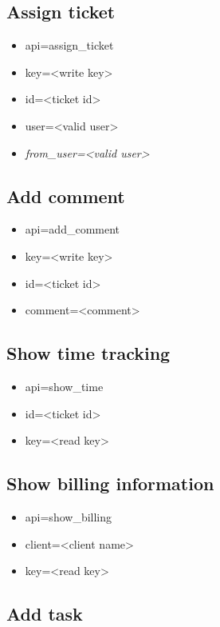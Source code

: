 \documentclass[11pt]{article}
\begin{document}
\subsection{Assign ticket}

\begin{itemize}
\item api=assign\_ticket
\item key=<write key>
\item id=<ticket id>
\item user=<valid user>
\item \textit{from\_user=<valid user>}
\end{itemize}

\subsection{Add comment}

\begin{itemize}
\item api=add\_comment
\item key=<write key>
\item id=<ticket id>
\item comment=<comment>
\end{itemize}

\subsection{Show time tracking}

\begin{itemize}
\item api=show\_time
\item id=<ticket id>
\item key=<read key>
\end{itemize}

\subsection{Show billing information}

\begin{itemize}
\item api=show\_billing
\item client=<client name>
\item key=<read key>
\end{itemize}

\subsection{Add task}
\end{document}
